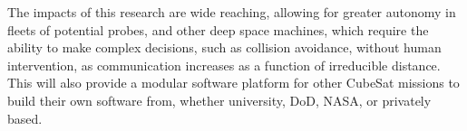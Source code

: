 The impacts of this research are wide reaching, allowing for greater autonomy in fleets of potential probes, and other deep space machines, which require the ability to make complex decisions, such as collision avoidance, without human intervention, as communication increases as a function of irreducible distance. This will also provide a modular software platform for other CubeSat missions to build their own software from, whether university, DoD, NASA, or privately based. 


